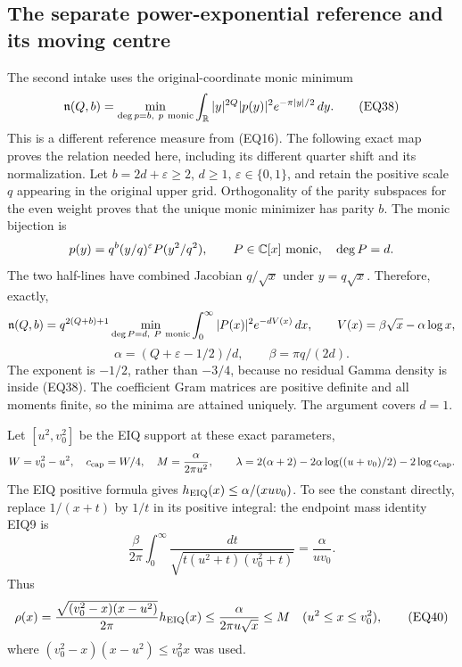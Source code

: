 \subsection{The separate power-exponential reference and its moving centre}
\label{eqreview:powerexponential}

The second intake uses the original-coordinate monic minimum
\[
 {\mathfrak n}(Q,b)=
 \min_{\deg p=b,\ p\ {\rm monic}}
 \int_{\mathbb R}|y|^{2Q}|p(y)|^2e^{-\pi|y|/2}\,dy.
\tag{EQ38}
\]
This is a different reference measure from (EQ16).  The following exact
map proves the relation needed here, including its different quarter
shift and its normalization.  Let \(b=2d+\varepsilon\ge2\),
\(d\ge1\), \(\varepsilon\in\{0,1\}\), and retain the positive scale
\(q\) appearing in the original upper grid.  Orthogonality of the parity
subspaces for the even weight proves that the unique monic minimizer
has parity \(b\).  The monic bijection is
\[
 p(y)=q^b(y/q)^\varepsilon P(y^2/q^2),\qquad
 P\in\mathbb C[x]\ {\rm monic},\quad\deg P=d.
\]
The two half-lines have combined Jacobian \(q/\sqrt x\) under
\(y=q\sqrt x\).  Therefore, exactly,
\[
 {\mathfrak n}(Q,b)
 =q^{2(Q+b)+1}
 \min_{\deg P=d,\ P\ {\rm monic}}
 \int_0^\infty |P(x)|^2e^{-dV(x)}\,dx,\qquad
 V(x)=\beta\sqrt x-\alpha\log x,
\]
\[
 \alpha=(Q+\varepsilon-1/2)/d,\qquad
 \beta=\pi q/(2d).
\tag{EQ39}
\]
The exponent is \(-1/2\), rather than \(-3/4\), because no residual
Gamma density is inside (EQ38).  The coefficient Gram matrices are
positive definite and all moments finite, so the minima are attained
uniquely.  The argument covers \(d=1\).

Let \([u^2,v_0^2]\) be the EIQ support at these exact parameters,
\[
 W=v_0^2-u^2,\quad c_{\rm cap}=W/4,\quad
 M=\frac{\alpha}{2\pi u^2},\qquad
 \lambda=2(\alpha+2)-2\alpha\log((u+v_0)/2)-2\log c_{\rm cap}.
\]
The EIQ positive formula gives
\(h_{\rm EIQ}(x)\le\alpha/(xuv_0)\).  To see the constant directly,
replace \(1/(x+t)\) by \(1/t\) in its positive integral:
the endpoint mass identity EIQ9 is
\[
 \frac{\beta}{2\pi}\int_0^\infty
       \frac{dt}{\sqrt{t(u^2+t)(v_0^2+t)}}=\frac{\alpha}{uv_0}.
\]
Thus
\[
 \rho(x)=\frac{\sqrt{(v_0^2-x)(x-u^2)}}{2\pi}h_{\rm EIQ}(x)
 \le \frac{\alpha}{2\pi u\sqrt x}
 \le M\quad (u^2\le x\le v_0^2),
\tag{EQ40}
\]
where \((v_0^2-x)(x-u^2)\le v_0^2x\) was used.

